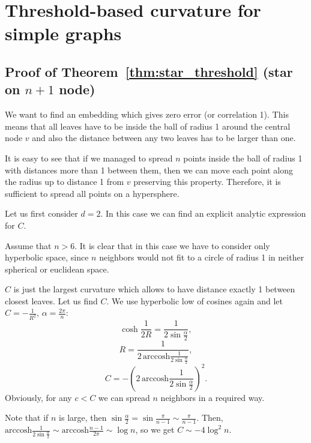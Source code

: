 \documentclass{article} %
\begin{document}
\section{Threshold-based curvature for simple graphs}

\subsection{Proof of Theorem~\ref{thm:star_threshold} (star on $n+1$ node)}

We want to find an embedding which gives zero error (or correlation 1). This means that all leaves have to be inside the ball of radius 1 around the central node $v$ and also the distance between any two leaves has to be larger than one. 

It is easy to see that if we managed to spread $n$ points inside the ball of radius 1 with distances more than 1 between them, then we can move each point along the radius up to distance 1 from $v$ preserving this property. Therefore, it is sufficient to spread all points on a hypersphere. 

Let us first consider $d = 2$. In this case we can find an explicit analytic expression for $C$.

Assume that $n > 6$. It is clear that in this case we have to consider only hyperbolic space, since $n$ neighbors would not fit to a circle of radius 1 in neither spherical or euclidean space.

$C$ is just the largest curvature which allows to have distance exactly 1 between closest leaves. Let us find $C$. We use hyperbolic low of cosines again and let $C = -\frac{1}{R^2}$, $\alpha = \frac{2\pi}{n}$:
\[
\cosh\frac{1}{2R} = \frac{1}{2\sin \frac{\alpha}{2}},
\]
\[
R = \frac{1}{2\,\textrm{arccosh}\frac{1}{2\sin \frac{\alpha}{2}}},
\]
\[
C = - \left(2\,\textrm{arccosh}\frac{1}{2\sin \frac{\alpha}{2}}\right)^2.
\]
Obviously, for any $c < C$ we can spread $n$ neighbors in a required way.

Note that if $n$ is large, then $\sin \frac{\alpha}{2} = \sin\frac{\pi}{n-1} \sim \frac{\pi}{n-1}$. Then,  $\textrm{arccosh}\frac{1}{2\sin \frac{\alpha}{2}} \sim \textrm{arccosh}\frac{n-1}{2\pi} \sim \log n$, so we get $C \sim - 4 \log^2 n$. 
\end{document}
